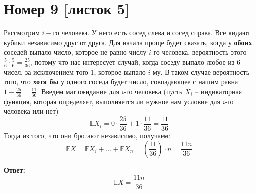 \documentclass[a4paper,12pt]{article}
\begin{document}
\section*{Номер 9 [листок 5]}
Рассмотрим $i-$го человека. У него есть сосед слева и сосед справа. Все кидают кубики независимо друг от друга. Для начала проще будет сказать, когда у \textbf{обоих} соседей выпало число, которое не равно числу $i$-го человека, вероятность этого $ \frac{5}{6} \cdot \frac{5}{6} = \frac{25}{36}$, потому что нас интересует случай, когда соседу выпало любое из 6 чисел, за исключением того 1, которое выпало $i$-му. В таком случае вероятность того, что \textbf{хотя бы} у одного соседа будет число, совпадающее с нашим равна $1 - \frac{25}{36} = \frac{11}{36}$. Введем мат.ожидание для $i$-го человека (пусть $X_i$ --  индикаторная функция, которая определяет, выполняется ли нужное нам условие для $i$-го человека или нет)
\[
\mathbb{E}X_i = 0 \cdot \frac{25}{36} + 1 \cdot \frac{11}{36} = \frac{11}{36}
\]
Тогда из того, что они бросают независимо, получаем:
\[
\mathbb{E}X = \mathbb{E}X_i + \ldots + \mathbb{E}X_n = \left(\frac{11}{36}\right)  \cdot n = \frac{11n}{36}
\]
\begin{center}
\textbf{Ответ: } 
\[
\mathbb{E}X = \frac{11n}{36}
\]
\end{center}
\clearpage
\end{document}
